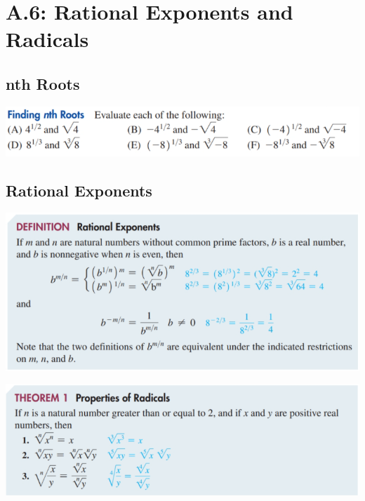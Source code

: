 \documentclass[14pt]{extarticle}
\begin{document}
\section{A.6: Rational Exponents and Radicals}
\subsection{nth Roots}
\begin{center}
	\includegraphics[width=1\linewidth]{a-6-1}
\end{center}
\subsection{Rational Exponents}
\begin{center}
	\includegraphics[width=1\linewidth]{a-6-2}
\end{center}
\begin{center}
	\includegraphics[width=1\linewidth]{a-6-3}
\end{center}
\end{document}
